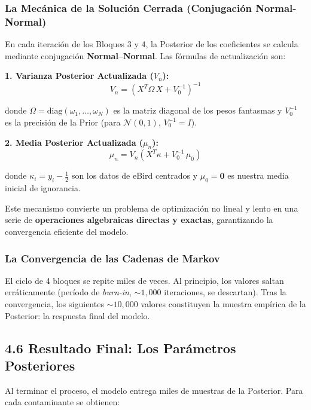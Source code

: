 \documentclass[12pt]{article}
\begin{document}
\subsubsection*{La Mecánica de la Solución Cerrada (Conjugación Normal-Normal)}

En cada iteración de los Bloques 3 y 4, la Posterior de los coeficientes se calcula mediante conjugación \textbf{Normal--Normal}. Las fórmulas de actualización son:

\medskip
\textbf{1. Varianza Posterior Actualizada ($V_n$):}
\begin{equation}
  V_n = \left(X^T \Omega\, X + V_0^{-1}\right)^{-1}
\end{equation}

donde $\Omega = \text{diag}(\omega_1, \dots, \omega_N)$ es la matriz diagonal de los pesos fantasmas y $V_0^{-1}$ es la precisión de la Prior (para $\mathcal{N}(0,1)$, $V_0^{-1} = I$).

\medskip
\textbf{2. Media Posterior Actualizada ($\mu_n$):}
\begin{equation}
  \mu_n = V_n \left(X^T \kappa + V_0^{-1}\,\mu_0\right)
\end{equation}

donde $\kappa_i = y_i - \tfrac{1}{2}$ son los datos de eBird centrados y $\mu_0 = \mathbf{0}$ es nuestra media inicial de ignorancia.

\medskip
Este mecanismo convierte un problema de optimización no lineal y lento en una serie de \textbf{operaciones algebraicas directas y exactas}, garantizando la convergencia eficiente del modelo.

\subsubsection*{La Convergencia de las Cadenas de Markov}

El ciclo de 4 bloques se repite miles de veces. Al principio, los valores saltan erráticamente (período de \textit{burn-in}, ${\sim}1{,}000$ iteraciones, se descartan). Tras la convergencia, los siguientes ${\sim}10{,}000$ valores constituyen la muestra empírica de la Posterior: la respuesta final del modelo.

\subsection*{4.6 Resultado Final: Los Parámetros Posteriores}

Al terminar el proceso, el modelo entrega miles de muestras de la Posterior. Para cada contaminante se obtienen:
\end{document}

